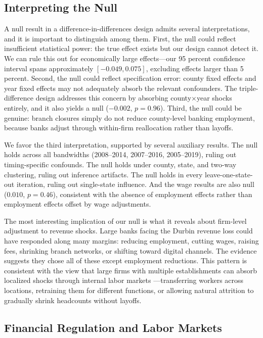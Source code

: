 \documentclass[12pt]{article}
\begin{document}
\subsection{Interpreting the Null}

A null result in a difference-in-differences design admits several interpretations, and it is important to distinguish among them. First, the null could reflect insufficient statistical power: the true effect exists but our design cannot detect it. We can rule this out for economically large effects---our 95 percent confidence interval spans approximately $[-0.049, 0.075]$, excluding effects larger than 5 percent. Second, the null could reflect specification error: county fixed effects and year fixed effects may not adequately absorb the relevant confounders. The triple-difference design addresses this concern by absorbing county$\times$year shocks entirely, and it also yields a null ($-0.002$, $p = 0.96$). Third, the null could be genuine: branch closures simply do not reduce county-level banking employment, because banks adjust through within-firm reallocation rather than layoffs.

We favor the third interpretation, supported by several auxiliary results. The null holds across all bandwidths (2008--2014, 2007--2016, 2005--2019), ruling out timing-specific confounds. The null holds under county, state, and two-way clustering, ruling out inference artifacts. The null holds in every leave-one-state-out iteration, ruling out single-state influence. And the wage results are also null ($0.010$, $p = 0.46$), consistent with the absence of employment effects rather than employment effects offset by wage adjustments.

The most interesting implication of our null is what it reveals about firm-level adjustment to revenue shocks. Large banks facing the Durbin revenue loss could have responded along many margins: reducing employment, cutting wages, raising fees, shrinking branch networks, or shifting toward digital channels. The evidence suggests they chose all of these except employment reductions. This pattern is consistent with the view that large firms with multiple establishments can absorb localized shocks through internal labor markets \citep{autor2003}---transferring workers across locations, retraining them for different functions, or allowing natural attrition to gradually shrink headcounts without layoffs.

\subsection{Financial Regulation and Labor Markets}
\end{document}
